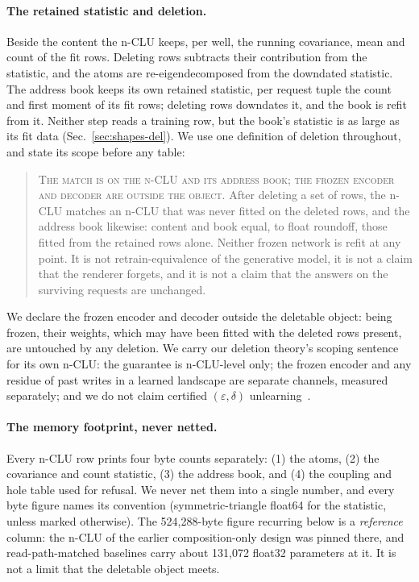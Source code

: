 \documentclass{article} %
\begin{document}
\paragraph{The retained statistic and deletion.} Beside the content the n-CLU keeps, per
well, the running covariance, mean and count of the fit rows. Deleting rows subtracts their
contribution from the statistic, and the atoms are re-eigendecomposed from the downdated
statistic. The address book keeps its own retained statistic, per request tuple the count and first
moment of its fit rows; deleting rows downdates it, and the book is refit from it. Neither step
reads a training row, but the book's statistic is as large as its fit data
(Sec.~\ref{sec:shapes-del}). We use one definition of deletion throughout, and state its scope
before any table:

\begin{quote}\small
\textsc{The match is on the n-CLU and its address book; the frozen encoder and decoder are outside
the object.} After deleting a set of rows, the n-CLU matches an n-CLU that was never fitted on the
deleted rows, and the address book likewise: content and book equal, to float roundoff, those fitted
from the retained rows alone. Neither frozen network is refit at any point. It is
not retrain-equivalence of the generative model, it is not a claim that the renderer forgets, and it
is not a claim that the answers on the surviving requests are unchanged.
\end{quote}

\noindent We declare the frozen encoder and decoder outside the deletable object: being frozen,
their weights, which may have been fitted with the deleted rows present, are untouched by any deletion.
We carry our deletion theory's scoping sentence for its own n-CLU: the guarantee
is n-CLU-level only; the frozen encoder and any residue of past writes in a learned
landscape are separate channels, measured separately; and we do not claim certified
$(\varepsilon,\delta)$ unlearning~\citep{guo2020certified}. %



\paragraph{The memory footprint, never netted.} Every n-CLU row prints four byte counts
separately: (1) the atoms, (2) the covariance and count statistic, (3) the address book, and
(4) the coupling and hole table used for refusal.
We never net them into a single number, and every byte figure names its convention
(symmetric-triangle float64 for the statistic, unless marked otherwise). The 524,288-byte figure
recurring below is a \emph{reference} column: the n-CLU of the earlier composition-only design
was pinned there, and read-path-matched baselines carry about 131,072 float32 parameters at it. %
It is not a limit that the deletable object meets.
\end{document}
